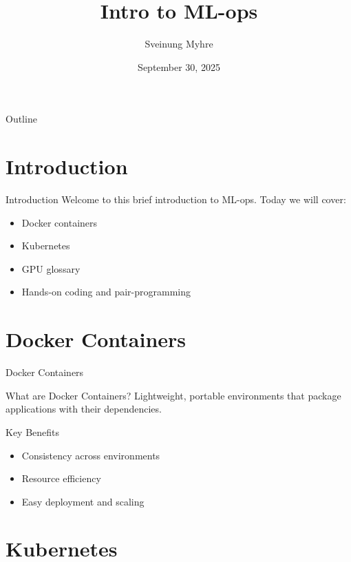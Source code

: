 \documentclass[11pt]{beamer}
\author[Sveinung Myhre]{Sveinung Myhre}
\title{Intro to ML-ops}
\institute[]{ReLU NTNU}
\date{September 30, 2025}
\begin{document}
\begin{frame}
\titlepage
\end{frame}

\begin{frame}{Outline}
\tableofcontents
\end{frame}

\section{Introduction}

\begin{frame}{Introduction}
Welcome to this brief introduction to ML-ops. Today we will cover:

\begin{itemize}
    \item Docker containers
    \item Kubernetes
    \item GPU glossary
    \item Hands-on coding and pair-programming
\end{itemize}
\end{frame}

\section{Docker Containers}

\begin{frame}{Docker Containers}
    \begin{block}{What are Docker Containers?}
    Lightweight, portable environments that package applications with their dependencies.
    \end{block}

    \begin{block}{Key Benefits}
    \begin{itemize}
        \item Consistency across environments
        \item Resource efficiency
        \item Easy deployment and scaling
    \end{itemize}
    \end{block}
\end{frame}

\section{Kubernetes}
\end{document}
